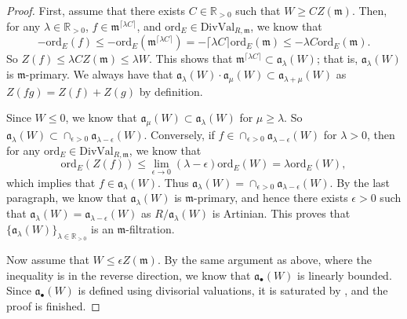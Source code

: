 \documentclass[11pt, leqno]{amsart}%
\theoremstyle{plain}
\newtheorem{lemma}[theorem]{Lemma}
\theoremstyle{definition}
\theoremstyle{remark}
\newcommand{\bR}{\mathbb{R}}
\newcommand{\fa}{\mathfrak{a}}
\newcommand{\fm}{\mathfrak{m}}
\newcommand{\ord}{\mathrm{ord}}
\newcommand{\DivVal}{\mathrm{DivVal}}
\newcommand{\Fil}{\mathrm{Fil}}
\begin{document}
\begin{proof}
	First, assume that there exists $C\in\bR_{>0}$ such that $W\ge CZ(\fm)$. Then, for any $\lambda\in\bR_{>0}$, $f\in\fm^{\lceil\lambda C\rceil}$, and $\ord_E\in\DivVal_{R,\fm}$, we know that 
	\[
	-\ord_E(f)\le -\ord_E(\fm^{\lceil\lambda C\rceil})=-\lceil \lambda C\rceil \ord_E(\fm)\le -\lambda C\ord_E(\fm).
	\]
	So $Z(f)\le \lambda CZ(\fm)\le \lambda W$. 
    This shows that $\fm^{\lceil\lambda C\rceil}\subset \fa_\lambda(W)$; that is, $\fa_\lambda(W)$ is $\fm$-primary.
	We always have that $\fa_\lambda(W)\cdot\fa_\mu(W)\subset\fa_{\lambda+\mu}(W)$ as $Z(fg)=Z(f)+Z(g)$ by definition. 
    
    Since $W\le 0$, we know that $\fa_\mu(W)\subset \fa_\lambda(W)$ for $\mu\ge \lambda$. 
    So $\fa_\lambda(W)\subset\cap_{\epsilon>0}\fa_{\lambda-\epsilon}(W)$. 
    Conversely, if $f\in\cap_{\epsilon>0}\fa_{\lambda-\epsilon}(W)$ for $\lambda>0$, then for any $\ord_E\in\DivVal_{R,\fm}$, we know that
	\[
	   \ord_E(Z(f))\le\lim_{\epsilon\to 0} (\lambda-\epsilon)\ord_E(W)=\lambda\ord_E(W),
	\]
	which implies that $f\in\fa_\lambda(W)$. Thus $\fa_\lambda(W)=\cap_{\epsilon>0}\fa_{\lambda-\epsilon}(W)$. By the last paragraph, we know that $\fa_\lambda(W)$ is $\fm$-primary, and hence there exists $\epsilon>0$ such that $\fa_\lambda(W)=\fa_{\lambda-\epsilon}(W)$ as $R/\fa_\lambda(W)$ is Artinian. 
    This proves that $\{\fa_\lambda(W)\}_{\lambda\in\bR_{>0}}$ is an $\fm$-filtration.
	
    Now assume that $W\le \epsilon Z(\fm)$. By the same argument as above, where the inequality is in the reverse direction, we know that $\fa_\bullet(W)$ is linearly bounded. 
    Since $\fa_\bullet(W)$ is defined using divisorial valuations, it is saturated by \cite[Proposition 2.20]{Qi-local}, and the proof is finished.
\end{proof}

\end{document}
